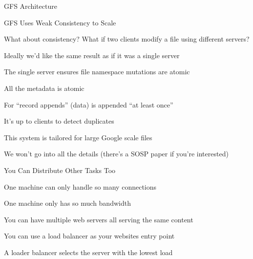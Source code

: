   \begin{frame}{GFS Architecture}
    \begin{center}
      
    \end{center}
  \end{frame}

  \begin{frame}{GFS Uses Weak Consistency to Scale}

    What about consistency? What if two clients modify a file using
    different servers?

    \hspace{2em} Ideally we'd like the same result as if it was a single server

    \vspace{2em}

    The single server ensures file namespace mutations are atomic

    \hspace{2em} All the metadata is atomic

    \vspace{2em}

    For ``record appends'' (data) is appended ``at least once''

    \hspace{2em} It's up to clients to detect duplicates

    \vspace{2em}

    This system is tailored for large Google scale files
    
    \hspace{2em} We won't go into all the details (there's a SOSP paper if you're
    interested)
  \end{frame}

  \begin{frame}{You Can Distribute Other Tasks Too}

    One machine can only handle so many connections

    \hspace{2em} One machine only has so much bandwidth

    \vspace{2em}

    You can have multiple web servers all serving the same content

    \hspace{2em} You can use a load balancer as your websites entry point

    \hspace{4em} A loader balancer selects the server with the lowest load
  \end{frame}

